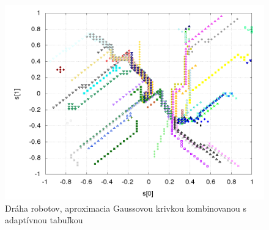   \begin{figure}[!htb]
  \centering
  \includegraphics[scale=.4]{../../results_q_learning/map_2/function_type_6/iterations_10/agents_path_surface.png}
  \caption{Dráha robotov, aproximacia  Gaussovou krivkou kombinovanou s adaptívnou tabuľkou}
  \label{img:experiment_gauss_adaptive_table_path}
  \end{figure}
